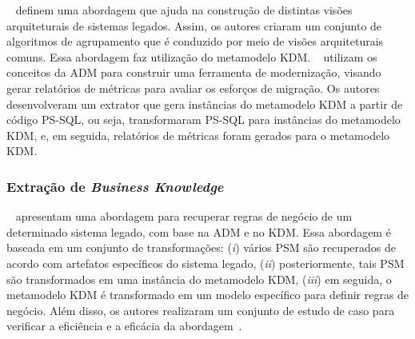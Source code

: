  
 
 
~ definem uma abordagem que ajuda na construção de distintas visões arquiteturais de sistemas legados. Assim, os autores criaram um conjunto de algoritmos de agrupamento que é conduzido por meio de visões arquiteturais comuns. Essa abordagem faz
utilização do metamodelo KDM. ~ utilizam os conceitos da ADM para construir uma ferramenta de modernização, visando gerar relatórios de métricas para avaliar os esforços de migração. Os autores desenvolveram um extrator que gera instâncias do metamodelo KDM a partir de código PS-SQL, ou seja, transformaram PS-SQL para instâncias do metamodelo KDM, e, em seguida, relatórios de métricas foram gerados para o metamodelo KDM.

 

\subsubsection{Extração de \textit{Business Knowledge}}
\label{ssub:Business_Knowledge_Extraction}

~ apresentam uma abordagem para recuperar regras de negócio de um determinado sistema legado, com base na ADM e no KDM. Essa abordagem é baseada em um conjunto de transformações: (\textit{i}) vários PSM são recuperados de acordo com artefatos específicos do sistema legado, (\textit{ii}) posteriormente, tais PSM são transformados em uma instância do metamodelo KDM, (\textit{iii}) em seguida, o metamodelo KDM é transformado em um modelo específico para definir regras de negócio. Além disso, os autores realizaram um conjunto de estudo de caso para verificar a eficiência e a eficácia da abordagem~\cite{PerezCastillo20121370}.

